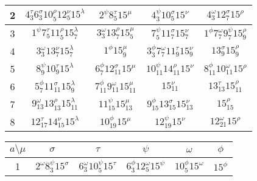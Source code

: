\documentclass[a4paper,12pt]{report}
\begin{document}
\begin{center}
\begin{tabular}{|c|c|c|c|c|}
2 & $4_{3}^{\tau}6_{3}^{\sigma}10_{5}^{\rho}12_{5}^{\nu}15^{\lambda}$ & $2^{\psi}8_{5}^{\tau}15^{\mu}$ & $4_{3}^{\psi}10_{5}^{\sigma}15^{\nu}$ & $4_{3}^{\omega}12_{7}^{\sigma}15^{\rho}$   \\
\hline

3 & $1^{\psi}7_{5}^{\tau}11_{5}^{\rho}15_{7}^{\lambda}$ & $3_{3}^{\omega}13_{7}^{\rho}15_{5}^{\mu}$ & $7_{5}^{\psi}11_{7}^{\sigma}15_{7}^{\nu}$ & $1^{\phi}7_{7}^{\omega}9_{7}^{\psi}15_{9}^{\rho}$  \\
\hline

4 & $3_{3}^{\omega}13_{7}^{\nu}15_{7}^{\lambda}$ & $1^{\phi}15_{9}^{\mu}$ & $3_{3}^{\phi}7_{7}^{\omega}11_{9}^{\tau}15_{9}^{\nu}$ & $13_{9}^{\sigma}15_{9}^{\rho}$  \\
\hline

5 & $8_{9}^{\psi}10_{9}^{\tau}15^{\lambda}$ & $6_{7}^{\phi}12_{11}^{\sigma}15^{\mu}$ & $10_{11}^{\psi}14_{11}^{\rho}15^{\nu}$ & $8_{11}^{\phi}10_{11}^{\omega}15^{\rho}$  \\
\hline

6 & $5_{7}^{\phi}11_{11}^{\sigma}15_{9}^{\lambda}$ &
$7_{11}^{\phi}9_{11}^{\omega}15_{11}^{\mu}$ & $15_{11}^{\nu}$ & $13_{13}^{\tau}15_{11}^{\rho}$   \\
\hline

7 & $9_{13}^{\omega}13_{13}^{\rho}15_{11}^{\lambda}$ & $11_{15}^{\psi}15_{13}^{\mu}$ & $9_{15}^{\phi}13_{15}^{\sigma}15_{13}^{\nu}$ & $15_{15}^{\rho}$ \\
\hline

8 & $12_{17}^{\tau}14_{15}^{\nu}15^{\lambda}$ & $10_{19}^{\phi}15^{\mu}$ & $12_{19}^{\psi}15^{\nu}$ & $12_{21}^{\omega}15^{\rho}$  \\
\hline

\end{tabular}

\begin{tabular}{|c|c|c|c|c|c|}\hline
 $ a\setminus\mu$ & \hspace{1cm} $\sigma$ \hspace{1cm} & \hspace{5mm} $\tau$ \hspace{5mm} & \hspace{5mm} $\psi$ \hspace{5mm} & \hspace{5mm} $\omega$ \hspace{5mm} & \hspace{0.5cm} $\phi$ \hspace{0.5cm} \\ \hline
1 & $2^{\omega}8_{3}^{\psi}15^{\sigma}$ & $6_{3}^{\omega}10_{5}^{\psi}15^{\tau}$ & $6_{3}^{\phi}12_{5}^{\omega}15^{\psi}$ & $10_{5}^{\phi}15^{\omega}$ & $15^{\phi}$ \\
\hline


\end{tabular}
\end{center}
\end{document}
